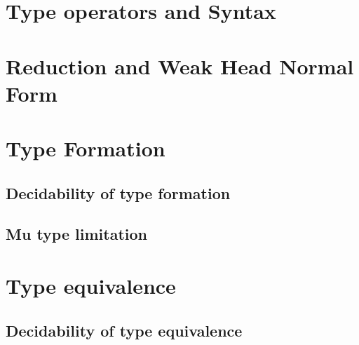 %

\section{Type operators and Syntax}
\section{Reduction and Weak Head Normal Form}
\section{Type Formation}
\subsection{Decidability of type formation}
\subsection{Mu type limitation}
\section{Type equivalence}
\subsection{Decidability of type equivalence}

\LIMPA



